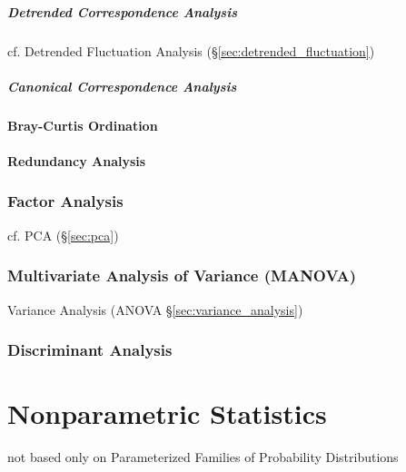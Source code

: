 \subparagraph{Detrended Correspondence Analysis}
\label{sec:detrended_correspondence}\hfill

\fist cf. Detrended Fluctuation Analysis (\S\ref{sec:detrended_fluctuation})



\subparagraph{Canonical Correspondence Analysis}
\label{sec:canonical_correspondence}\hfill



\paragraph{Bray-Curtis Ordination}\label{sec:bray_curtis_ordination}\hfill

\paragraph{Redundancy Analysis}\label{sec:redundancy_analysis}\hfill



\subsubsection{Factor Analysis}\label{sec:factor_analysis}

cf. PCA (\S\ref{sec:pca})



\subsubsection{Multivariate Analysis of Variance (MANOVA)}\label{sec:manova}

Variance Analysis (ANOVA \S\ref{sec:variance_analysis})



\subsubsection{Discriminant Analysis}\label{sec:discriminant_analysis}



\section{Nonparametric Statistics}\label{sec:nonparametric_statistics}

not based only on Parameterized Families of Probability Distributions

